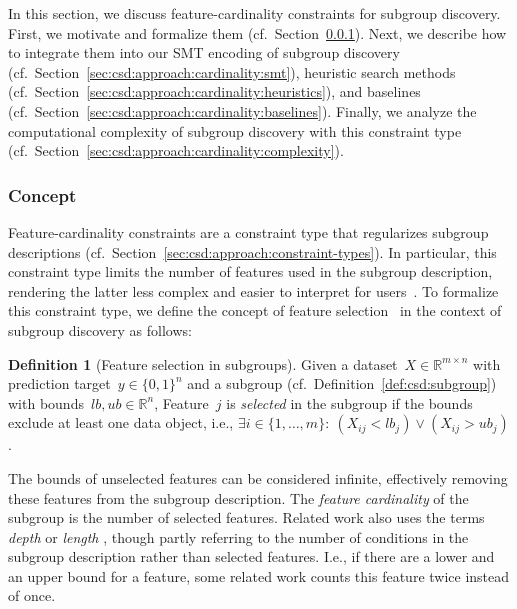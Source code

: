 \documentclass{article}
\theoremstyle{definition}
\newtheorem{definition}{Definition}
\begin{document}
In this section, we discuss feature-cardinality constraints for subgroup discovery.
First, we motivate and formalize them (cf.~Section~\ref{sec:csd:approach:cardinality:concept}).
Next, we describe how to integrate them into our SMT encoding of subgroup discovery (cf.~Section~\ref{sec:csd:approach:cardinality:smt}), heuristic search methods (cf.~Section~\ref{sec:csd:approach:cardinality:heuristics}), and baselines (cf.~Section~\ref{sec:csd:approach:cardinality:baselines}).
Finally, we analyze the computational complexity of subgroup discovery with this constraint type (cf.~Section~\ref{sec:csd:approach:cardinality:complexity}).

\subsubsection{Concept}
\label{sec:csd:approach:cardinality:concept}

Feature-cardinality constraints are a constraint type that regularizes subgroup descriptions (cf.~Section~\ref{sec:csd:approach:constraint-types}).
In particular, this constraint type limits the number of features used in the subgroup description, rendering the latter less complex and easier to interpret for users~\cite{meeng2021real}.
To formalize this constraint type, we define the concept of feature selection~\cite{guyon2003introduction, li2017feature} in the context of subgroup discovery as follows:
%
\begin{definition}[Feature selection in subgroups]
	Given a dataset~$X \in \mathbb{R}^{m \times n}$ with prediction target~$y \in \{0, 1\}^n$ and a subgroup (cf.~Definition~\ref{def:csd:subgroup}) with bounds~$\mathit{lb}, \mathit{ub} \in \mathbb{R}^n$,
	Feature~$j$ is \emph{selected} in the subgroup if the bounds exclude at least one data object, i.e., $\exists i \in \{1, \dots, m\}:~ \left( X_{ij} < \mathit{lb}_j \right) \lor \left( X_{ij} > \mathit{ub}_j \right)$.
	\label{def:csd:feature-selection}
\end{definition}
%
The bounds of unselected features can be considered infinite, effectively removing these features from the subgroup description.
The \emph{feature cardinality} of the subgroup is the number of selected features.
Related work also uses the terms \emph{depth} \cite{meeng2021real} or \emph{length} \cite{atzmueller2015subgroup, helal2016subgroup}, though partly referring to the number of conditions in the subgroup description rather than selected features.
I.e., if there are a lower and an upper bound for a feature, some related work counts this feature twice instead of once.
\end{document}
